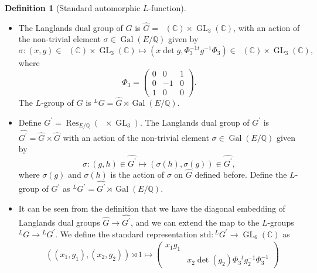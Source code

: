 \documentclass[11pt, a4paper]{amsart}
\theoremstyle{plain}
\theoremstyle{definition}
\newtheorem{definition}[theorem]{Definition}
\numberwithin{equation}{section}
\def\CC{\mathbb{C}}
\def\QQ{\mathbb{Q}}
\DeclareMathOperator{\Gal}{Gal}
\DeclareMathOperator{\Res}{Res}
\DeclareMathOperator{\GL}{\mathrm{GL}}
\DeclareMathOperator{\Gm}{\mathrm{G_{m}}}
\begin{document}
\begin{definition}[Standard automorphic $L$-function]
\label{def: L-function}
\begin{itemize}
    \item The Langlands dual group of $G$ is $\widehat{G} = \Gm(\CC) \times \GL_3(\CC)$, with an action of the non-trivial element $\sigma \in \Gal(E/\QQ)$ given by 
    \begin{equation*}
        \sigma \colon (x, g) \in \Gm(\CC) \times \GL_3(\CC) \mapsto (x \det g, \Phi_{3}^{-1} {^{t}g^{-1}} \Phi_{3}) \in \Gm(\CC) \times \GL_3(\CC),
    \end{equation*}
    where 
    \begin{equation*}
        \Phi_{3} = \begin{pmatrix}
                        0 & 0 & 1 \\
                        0 & -1 & 0 \\
                        1 & 0 & 0
                   \end{pmatrix}. 
    \end{equation*}
    The $L$-group of $G$ is ${^{L}G = \widehat{G} \rtimes \Gal(E/\QQ)}$. 
    \item Define $G^{\prime} = \Res_{E/\QQ}(\Gm \times \GL_3)$. The Langlands dual group of $G^{\prime}$ is $\widehat{G^{\prime}} = \widehat{G} \times \widehat{G}$ with an action of the non-trivial element $\sigma \in \Gal(E/\QQ)$ given by 
    \begin{equation*}
        \sigma \colon (g, h) \in \widehat{G^{\prime}} \mapsto (\sigma(h), \sigma(g)) \in \widehat{G^{\prime}}, 
    \end{equation*}
    where $\sigma(g)$ and $\sigma(h)$ is the action of $\sigma$ on $\widehat{G}$ defined before. Define the $L$-group of $G^{\prime}$ as ${^{L}G^{\prime}} = \widehat{G^{\prime}} \rtimes \Gal(E/\QQ)$. 
    \item It can be seen from the definition that we have the diagonal embedding of Langlands dual groups $\widehat{G} \rightarrow \widehat{G^{\prime}}$, and we can extend the map to the $L$-groups ${^{L}G} \rightarrow {^{L}G^{\prime}}$. We define the standard representation $\mathrm{std} \colon {^{L}G^{\prime}} \rightarrow \GL_6(\CC)$ as 
    \begin{align*}
        & ((x_1, g_1), (x_2, g_2)) \rtimes 1 \mapsto \begin{pmatrix}
                                             x_1 g_1 & \\
                                                     & x_2 \det(g_2) \Phi_3 {^{t}g_{2}^{-1} \Phi_{3}^{-1}}

\end{pmatrix}
\end{align*}
\end{itemize}
\end{definition}
\end{document}
